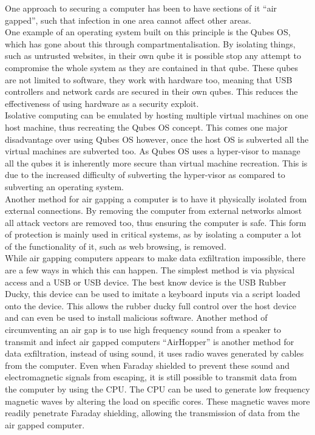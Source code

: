One approach to securing a computer has been to have sections of it “air gapped”, such that infection in one area cannot affect other areas.\cite{Reference19}\\
 One example of an operating system built on this principle is the Qubes OS, which has gone about this through compartmentalisation. By isolating things, such as untrusted websites, in their own qube it is possible stop any attempt to compromise the whole system as they are contained in that qube. These qubes are not limited to software, they work with hardware too, meaning that USB controllers and network cards are secured in their own qubes. This reduces the effectiveness of using hardware as a security exploit.\cite{Reference20}\\ 
Isolative computing can be emulated by hosting multiple virtual machines on one host machine, thus recreating the Qubes OS concept. This comes one major disadvantage over using Qubes OS however, once the host OS is subverted all the virtual machines are subverted too.\cite{Reference21} As Qubes OS uses a hyper-visor to manage all the qubes it is inherently more secure than virtual machine recreation. This is due to the increased difficulty of subverting the hyper-visor as compared to subverting an operating system.\\
Another method for air gapping a computer is to have it physically isolated from external connections. By removing the computer from external networks almost all attack vectors are removed too, thus ensuring the computer is safe. This form of protection is mainly used in critical systems, as by isolating a computer a lot of the functionality of it, such as web browsing, is removed.\cite{Reference22}\\
While air gapping computers appears to make data exfiltration impossible, there are a few ways in which this can happen. The simplest method is via physical access and a USB or USB device. The best know device is the USB Rubber Ducky, this device can be used to imitate a keyboard inputs via a script loaded onto the device.\cite{Reference23} This allows the rubber ducky full control over the host device and can even be used to install malicious software.\cite{Reference23} Another method of circumventing an air gap is to use high frequency sound from a speaker to transmit and infect air gapped computers\cite{Reference24} “AirHopper” is another method for data exfiltration, instead of using sound, it uses radio waves generated by cables from the computer.\cite{Reference25} Even when Faraday shielded to prevent these sound and electromagnetic signals from escaping, it is still possible to transmit data from the computer by using the CPU. The CPU can be used to generate low frequency magnetic waves by altering the load on specific cores. These magnetic waves more readily penetrate Faraday shielding, allowing the transmission of data from the air gapped computer.\cite{Reference26}

